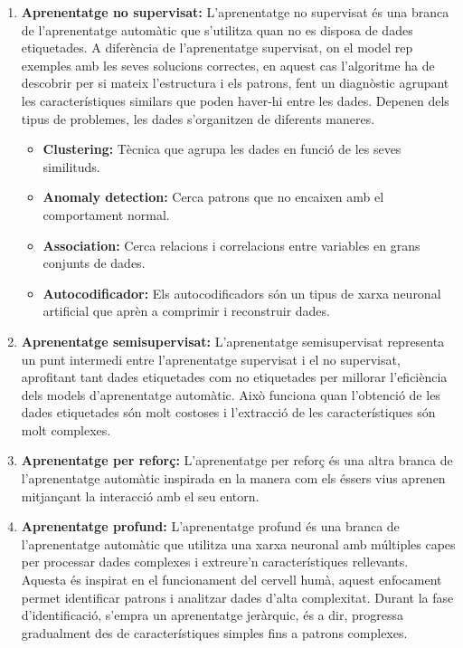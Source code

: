 \begin{enumerate}
\begin{enumerate}
        \item \textbf{Aprenentatge no supervisat:}
        L'aprenentatge no supervisat és una branca de l'aprenentatge automàtic que s'utilitza quan no es disposa de dades etiquetades. A diferència de l'aprenentatge supervisat, on el model rep exemples amb les seves solucions correctes, en aquest cas l'algoritme ha de descobrir per si mateix l'estructura i els patrons, fent un diagnòstic agrupant les característiques similars que poden haver-hi entre les dades. Depenen dels tipus de problemes, les dades s'organitzen de diferents maneres.
        \begin{itemize}
            \item \textbf{Clustering:} Tècnica que agrupa les dades en funció de les seves similituds.
            \item \textbf{Anomaly detection:} Cerca patrons que no encaixen amb el comportament normal.
            \item \textbf{Association:} Cerca relacions i correlacions entre variables en grans conjunts de dades.
            \item \textbf{Autocodificador:} Els autocodificadors són un tipus de xarxa neuronal artificial que aprèn a comprimir i reconstruir dades.
        \end{itemize}

        \item \textbf{Aprenentatge semisupervisat:}
        L'aprenentatge semisupervisat representa un punt intermedi entre l'aprenentatge supervisat i el no supervisat, aprofitant tant dades etiquetades com no etiquetades per millorar l'eficiència dels models d'aprenentatge automàtic. Això funciona quan l'obtenció de les dades etiquetades són molt costoses i l'extracció de les característiques són molt complexes.

        \item \textbf{Aprenentatge per reforç:}
        L'aprenentatge per reforç és una altra branca de l'aprenentatge automàtic inspirada en la manera com els éssers vius aprenen mitjançant la interacció amb el seu entorn.

        \item \textbf{Aprenentatge profund:}
        L'aprenentatge profund és una branca de l'aprenentatge automàtic que utilitza una xarxa neuronal amb múltiples capes per processar dades complexes i extreure'n característiques rellevants. Aquesta és inspirat en el funcionament del cervell humà, aquest enfocament permet identificar patrons i analitzar dades d'alta complexitat. Durant la fase d'identificació, s'empra un aprenentatge jeràrquic, és a dir, progressa gradualment des de característiques simples fins a patrons complexes.


\end{enumerate}
\end{enumerate}

